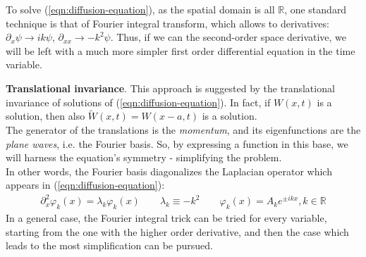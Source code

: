 \documentclass[../template.tex]{subfiles}
\begin{document}
To solve (\ref{eqn:diffusion-equation}), as the spatial domain is all $\mathbb{R}$, one standard technique is that of Fourier integral transform, which allows to  derivatives: $\partial_x \psi \to ik\psi$, $\partial_{xx} \to -k^2 \psi$. Thus, if we can  the second-order space derivative, we will be left with a much more simpler first order differential equation in the time variable.

\begin{expl}
    \textbf{Translational invariance}. This approach is suggested by the translational invariance of solutions of (\ref{eqn:diffusion-equation}). In fact, if $W(x,t)$ is a solution, then also $\tilde{W}(x,t) = W(x-a,t)$ is a solution.\\
    The generator of the translations is the \textit{momentum}, and its eigenfunctions are the \textit{plane waves}, i.e. the Fourier basis. So, by expressing a function in this base, we will harness the equation's symmetry - simplifying the problem.\\
    In other words, the Fourier basis diagonalizes the Laplacian operator which appears in (\ref{eqn:diffusion-equation}):
    \begin{align*}
        \partial_x^2 \varphi_k(x) = \lambda_k \varphi_k(x) \qquad \lambda_k \equiv -k^2 \qquad \varphi_k(x) = A_k e^{\pm i k x}, k \in \mathbb{R}
    \end{align*}
    In a general case, the Fourier integral trick can be tried for every variable, starting from the one with the higher order derivative, and then the case which leads to the most simplification can be pursued.
\end{expl}
\end{document}
